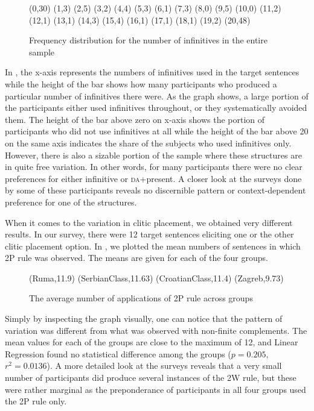 \documentclass[output=paper,
modfonts,
newtxmath,
hidelinks,
]{langscibook}
\begin{document}
\begin{figure}[h]
\footnotesize
\textsf{
%
{
(0,30) (1,3) (2,5) (3,2) (4,4) (5,3) (6,1) (7,3) (8,0) (9,5) (10,0) (11,2) (12,1) (13,1) (14,3) (15,4) (16,1) (17,1) (18,1) (19,2) (20,48)
}}
\caption{Frequency distribution for the number of infinitives in the entire sample}\label{fig:key:2}
\end{figure}


In , the x-axis represents the numbers of infinitives used in the target sentences while the height of the bar shows how many participants who produced a particular number of infinitives there were. As the graph shows, a large portion of the participants either used infinitives throughout, or they systematically avoided them. The height of the bar above zero on x-axis shows the portion of participants who did not use infinitives at all while the height of the bar above 20 on the same axis indicates the share of the subjects who used infinitives only. However, there is also a sizable portion of the sample where these structures are in quite free variation. In other words, for many participants there were no clear preferences for either infinitive or \textsc{da}+present. A closer look at the surveys done by some of these participants reveals no discernible pattern or context-dependent preference for one of the structures. 

When it comes to the variation in clitic placement, we obtained very different results. In our survey, there were 12 target sentences eliciting one or the other clitic placement option. In , we plotted the mean numbers of sentences in which 2P rule was observed. The means are given for each of the four groups.

  
\begin{figure}[h]
\footnotesize
\textsf{
%
{
(Ruma,11.9)
(SerbianClass,11.63)
(CroatianClass,11.4)
(Zagreb,9.73)
}}
\caption{The average number of applications of 2P rule across groups}\label{fig:key:3}
\end{figure}

Simply by inspecting the graph visually, one can notice that the pattern of variation was different from what was observed with non-finite complements. The mean values for each of the groups are close to the maximum of 12, and Linear Regression found no statistical difference among the groups ($p=0.205,$ $r^2 = 0.0136$). A more detailed look at the surveys reveals that a very small number of participants did produce several instances of the 2W rule, but these were rather marginal as the preponderance of participants in all four groups used the 2P rule only. 
\end{document}
